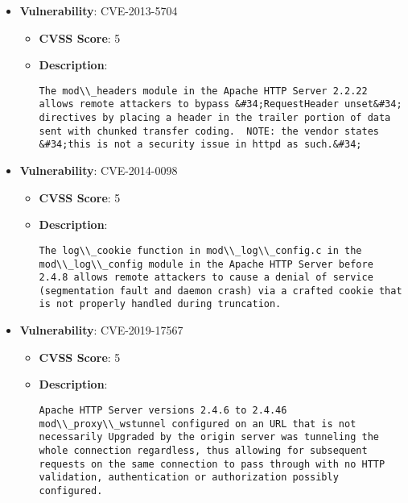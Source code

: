\documentclass{article}
\begin{document}
\begin{itemize}
        \item \textbf{Vulnerability}: CVE-2013-5704
        \begin{itemize}
            \item \textbf{CVSS Score}:  5 
            \item \textbf{Description}:
            \parbox[t]{0.9\linewidth}{
                \verb|The mod\\_headers module in the Apache HTTP Server 2.2.22 allows remote attackers to bypass &#34;RequestHeader unset&#34; directives by placing a header in the trailer portion of data sent with chunked transfer coding.  NOTE: the vendor states &#34;this is not a security issue in httpd as such.&#34;|
            }
        \end{itemize}
    
        \item \textbf{Vulnerability}: CVE-2014-0098
        \begin{itemize}
            \item \textbf{CVSS Score}:  5 
            \item \textbf{Description}:
            \parbox[t]{0.9\linewidth}{
                \verb|The log\\_cookie function in mod\\_log\\_config.c in the mod\\_log\\_config module in the Apache HTTP Server before 2.4.8 allows remote attackers to cause a denial of service (segmentation fault and daemon crash) via a crafted cookie that is not properly handled during truncation.|
            }
        \end{itemize}
    
        \item \textbf{Vulnerability}: CVE-2019-17567
        \begin{itemize}
            \item \textbf{CVSS Score}:  5 
            \item \textbf{Description}:
            \parbox[t]{0.9\linewidth}{
                \verb|Apache HTTP Server versions 2.4.6 to 2.4.46 mod\\_proxy\\_wstunnel configured on an URL that is not necessarily Upgraded by the origin server was tunneling the whole connection regardless, thus allowing for subsequent requests on the same connection to pass through with no HTTP validation, authentication or authorization possibly configured.|
            }
        \end{itemize}
    

\end{itemize}
\end{document}
